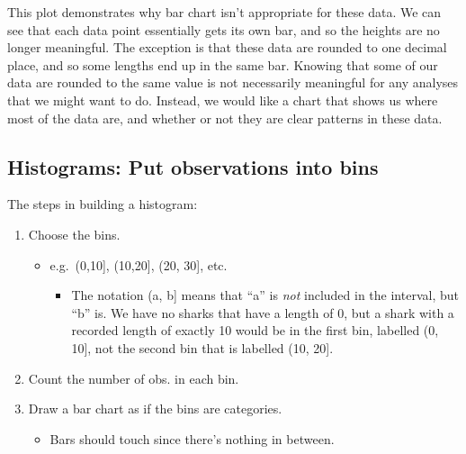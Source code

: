 \documentclass[
  letterpaper,
  DIV=11,
  numbers=noendperiod,
  oneside]{scrreprt}
\providecommand{\tightlist}{%
  \setlength{\itemsep}{0pt}\setlength{\parskip}{0pt}}\usepackage{longtable,booktabs,array}
\begin{document}
This plot demonstrates why bar chart isn't appropriate for these data.
We can see that each data point essentially gets its own bar, and so the
heights are no longer meaningful. The exception is that these data are
rounded to one decimal place, and so some lengths end up in the same
bar. Knowing that some of our data are rounded to the same value is not
necessarily meaningful for any analyses that we might want to do.
Instead, we would like a chart that shows us where most of the data are,
and whether or not they are clear patterns in these data.

\hypertarget{histograms-put-observations-into-bins}{%
\subsection{Histograms: Put observations into
bins}\label{histograms-put-observations-into-bins}}

The steps in building a histogram:

\begin{enumerate}
\def\labelenumi{\arabic{enumi}.}
\tightlist
\item
  Choose the bins.

  \begin{itemize}
  \tightlist
  \item
    e.g.~(0,10{]}, (10,20{]}, (20, 30{]}, etc.

    \begin{itemize}
    \tightlist
    \item
      The notation (a, b{]} means that ``a'' is \emph{not} included in
      the interval, but ``b'' is. We have no sharks that have a length
      of 0, but a shark with a recorded length of exactly 10 would be in
      the first bin, labelled (0, 10{]}, not the second bin that is
      labelled (10, 20{]}.
    \end{itemize}
  \end{itemize}
\item
  Count the number of obs. in each bin.
\item
  Draw a bar chart as if the bins are categories.

  \begin{itemize}
  \tightlist
  \item
    Bars should touch since there's nothing in between.
  \end{itemize}
\end{enumerate}
\end{document}

